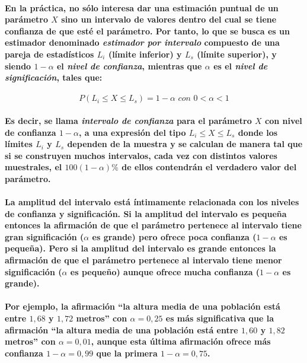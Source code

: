 \paragraph{
En la práctica, no sólo interesa dar una estimación puntual de un parámetro $X$ sino un intervalo de valores dentro del cual se tiene confianza de que esté el parámetro. Por tanto, lo que se busca es un estimador denominado \emph{estimador por intervalo} compuesto de una pareja de estadísticos $L_i$ (límite inferior) y $L_s$ (límite superior), y siendo $1-\alpha$ el \emph{nivel de confianza}, mientras que $\alpha$ es el \emph{nivel de significación}, tales que:
}
\begin{equation}
P(L_i \leq X \leq L_s) = 1 - \alpha \textit{ con } 0 < \alpha < 1
\end{equation}
\paragraph{
Es decir, se llama \emph{intervalo de confianza} para el parámetro $X$ con nivel de confianza $1-\alpha$, a una expresión del tipo $L_i \leq X \leq L_s$ donde los límites $L_i$ y $L_s$ dependen de la muestra y se calculan de manera tal que si se construyen muchos intervalos, cada vez con distintos valores muestrales, el $100(1-\alpha)\%$ de ellos contendrán el verdadero valor del parámetro.
}
\paragraph{
La amplitud del intervalo está íntimamente relacionada con los niveles de confianza y significación. Si la amplitud del intervalo es pequeña entonces la afirmación de que el parámetro pertenece al intervalo tiene gran significación ($\alpha$ es grande) pero ofrece poca confianza ($1-\alpha$ es pequeña). Pero si la amplitud del intervalo es grande entonces la afirmación de que el parámetro pertenece al intervalo tiene menor significación ($\alpha$ es pequeño) aunque ofrece mucha confianza ($1-\alpha$ es grande).
}
\paragraph{
Por ejemplo, la afirmación ``la altura media de una población está entre $1,68$ y $1,72$ metros'' con $\alpha=0,25$ es más significativa que la afirmación ``la altura media de una población está entre $1,60$ y $1,82$ metros'' con $\alpha=0,01$, aunque esta última afirmación ofrece más confianza $1-\alpha = 0,99$ que la primera $1-\alpha=0,75$.
}


